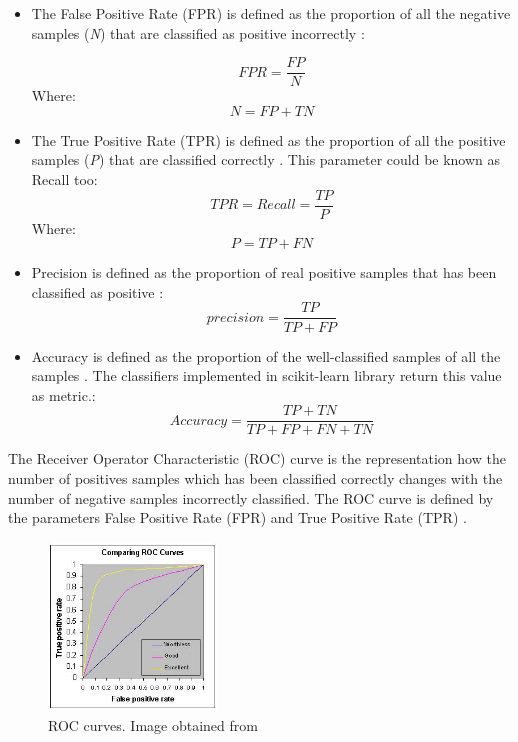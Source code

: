 \begin{itemize}
\item The False Positive Rate (FPR) is defined as the proportion of all the negative samples (\textit{N}) that are classified as positive incorrectly \cite{ROC}:

\begin{equation}
FPR = \frac{FP}{N}
\end{equation}
Where:
 \begin{equation}
  N = FP + TN
\end{equation} 

\item The True Positive Rate (TPR) is defined as the proportion of all the positive samples (\textit{P}) that are classified correctly \cite{ROC}. This parameter could be known as Recall too: 
\begin{equation}
TPR = Recall = \frac{TP}{P} 
\end{equation}
Where:
 \begin{equation}
  P = TP + FN
\end{equation} 

\item Precision is defined as the proportion of real positive samples that has been classified as positive \cite{ROC,Sokolova}:
\begin{equation}
  precision = \frac{TP}{TP + FP}
\end{equation}

\item Accuracy is defined as the proportion of the well-classified samples of all the samples \cite{Sokolova}. The classifiers implemented in scikit-learn library return this value as metric.:
\begin{equation}
  Accuracy = \frac{TP + TN}{TP + FP + FN + TN}
\end{equation}
\end{itemize}

The Receiver Operator Characteristic (ROC) curve is the representation how the number of positives samples which has been classified correctly changes with the number of negative samples incorrectly classified. The ROC curve is defined by the parameters False Positive Rate (FPR) and True Positive Rate (TPR) \cite{ROC}.\\

\begin{figure}[htb]
  \centering
  \includegraphics[width=0.4\textwidth]{images_miscelaneus/roccomp.jpg}
  \caption{ROC curves. Image obtained from \cite{RocImage}}
  \label{RocImage}
\end{figure}

